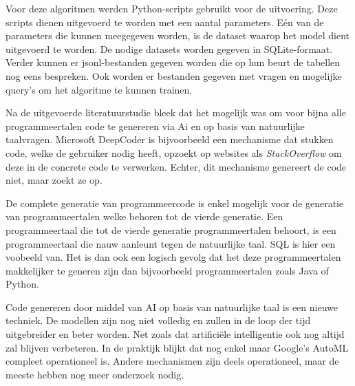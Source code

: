 Voor deze algoritmen werden Python-scripts gebruikt voor de uitvoering. Deze scripts dienen uitgevoerd te worden met een aantal parameters. Eén van de parameters die kunnen meegegeven worden, is de dataset waarop het model dient uitgevoerd te worden. De nodige datasets worden gegeven in SQLite-formaat. Verder kunnen er jsonl-bestanden gegeven worden die op hun beurt de tabellen nog eens bespreken. Ook worden er bestanden gegeven met vragen en mogelijke query's om het algoritme te kunnen trainen.

Na de uitgevoerde literatuurstudie bleek dat het mogelijk was om voor bijna alle programmeertalen code te genereren via Ai en op basis van natuurlijke taalvragen. Microsoft DeepCoder is bijvoorbeeld een mechanisme dat stukken code, welke de gebruiker nodig heeft, opzoekt op websites als \textit{StackOverflow} om deze in de concrete code te verwerken. Echter, dit mechanisme genereert de code niet, maar zoekt ze op. 

De complete generatie van programmeercode is enkel mogelijk voor de generatie van programmeertalen welke behoren tot de vierde generatie. Een programmeertaal die tot de vierde generatie programmeertalen behoort, is een programmeertaal die nauw aanleunt tegen de natuurlijke taal. SQL is hier een voobeeld van. Het is dan ook een logisch gevolg dat het deze programmeertalen makkelijker te generen zijn dan bijvoorbeeld programmeertalen zoals Java of Python.

Code genereren door middel van AI op basis van natuurlijke taal is een nieuwe techniek. De modellen zijn nog niet volledig en zullen in de loop der tijd uitgebreider en beter worden. Net zoals dat artificiële intelligentie ook nog altijd zal blijven verbeteren. In de praktijk blijkt dat nog enkel maar Google's AutoML compleet operationeel is. Andere mechanismen zijn deels operationeel, maar de meeste hebben nog meer onderzoek nodig.
